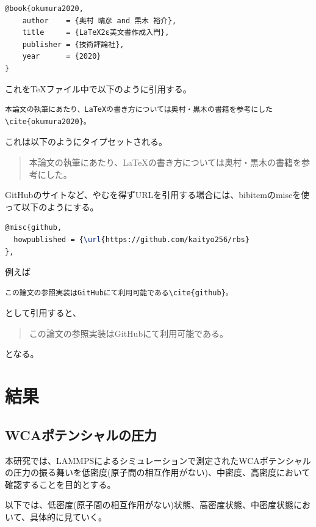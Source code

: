 \documentclass[titlepage]{jsreport}
\begin{document}
{{{\begin{lstlisting}[language=TeX]
@book{okumura2020,
    author    = {奥村 晴彦 and 黒木 裕介},
    title     = {LaTeX2ε美文書作成入門},
    publisher = {技術評論社},
    year      = {2020}
}
\end{lstlisting}

これをTeXファイル中で以下のように引用する。

\begin{verbatim}
本論文の執筆にあたり、LaTeXの書き方については奥村・黒木の書籍を参考にした\cite{okumura2020}。
\end{verbatim}

これは以下のようにタイプセットされる。
\begin{quotation}
    本論文の執筆にあたり、LaTeXの書き方については奥村・黒木の書籍を参考にした\cite{okumura2020}。
\end{quotation}


GitHubのサイトなど、やむを得ずURLを引用する場合には、bibitemのmiscを使って以下のようにする。

\begin{lstlisting}[language=TeX]
@misc{github,
  howpublished = {\url{https://github.com/kaityo256/rbs}
},
\end{lstlisting}

例えば

\begin{verbatim}
この論文の参照実装はGitHubにて利用可能である\cite{github}。
\end{verbatim}
として引用すると、

\begin{quotation}
    この論文の参照実装はGitHubにて利用可能である\cite{github}。
\end{quotation}
となる。




\chapter{結果} \label{chap:results}

\section{WCAポテンシャルの圧力}\label{results-sec:WCA-press}
本研究では、LAMMPSによるシミュレーションで測定されたWCAポテンシャルの圧力の振る舞いを低密度(原子間の相互作用がない)、中密度、高密度において確認することを目的とする。

以下では、低密度(原子間の相互作用がない)状態、高密度状態、中密度状態において、具体的に見ていく。

}}}
\end{document}
